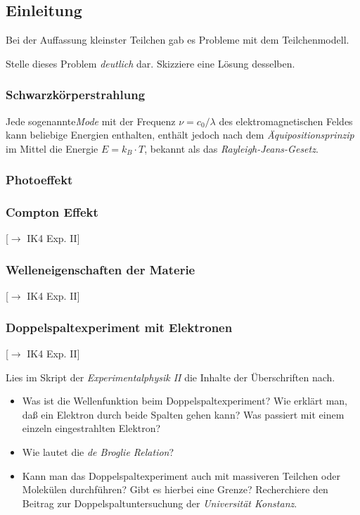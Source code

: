 \documentclass{article}
\begin{document}
    \subsection*{Einleitung}
        Bei der Auffassung kleinster Teilchen gab es Probleme mit dem Teilchenmodell. 
        \begin{Aufgabe}
            \nr{} Stelle dieses Problem \emph{deutlich} dar. Skizziere eine Lösung desselben. 
        \end{Aufgabe}
        \subsubsection*{Schwarzkörperstrahlung}
            Jede sogenannte\emph{Mode} mit der Frequenz $\nu = c_0/\lambda$ des elektromagnetischen Feldes kann beliebige Energien enthalten, enthält jedoch nach dem \emph{Äquipositionsprinzip} im Mittel die Energie $E = k_B\cdot T$, bekannt als das \emph{Rayleigh-Jeans-Gesetz}. 

        \subsubsection*{Photoeffekt}


        \subsubsection*{Compton Effekt}
            [$\to$ IK4 Exp. II] 

        \subsubsection*{Welleneigenschaften der Materie}
            [$\to$ IK4 Exp. II]

        \subsubsection*{Doppelspaltexperiment mit Elektronen}
            [$\to$ IK4 Exp. II]

        
        \begin{Aufgabe}
            \nr{} Lies im Skript der \emph{Experimentalphysik II} die Inhalte der Überschriften nach. 
            \begin{itemize}[label=$\to$]
                \item {}Was ist die Wellenfunktion beim Doppelspaltexperiment? Wie erklärt man, daß ein Elektron durch beide Spalten gehen kann? Was passiert mit einem einzeln eingestrahlten Elektron?
                \item {}Wie lautet die \emph{de Broglie Relation}?
                \item {}Kann man das Doppelspaltexperiment auch mit massiveren Teilchen oder Molekülen durchführen? Gibt es hierbei eine Grenze? Recherchiere den Beitrag zur Doppelspaltuntersuchung der \emph{Universität Konstanz}.
            \end{itemize}
        \end{Aufgabe}
\end{document}
